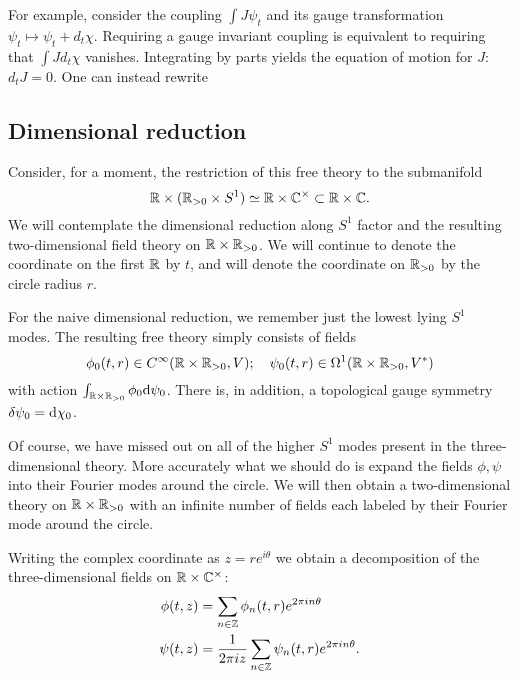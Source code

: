 \documentclass[11pt]{amsart}
\begin{document}
For example, consider the coupling $\int J \psi_t$ and its gauge transformation $\psi_t \mapsto \psi_t + d_t \chi$. Requiring a gauge invariant coupling is equivalent to requiring that $\int J d_t \chi$ vanishes. Integrating by parts yields the equation of motion for $J$: $d_t J = 0$. One can instead rewrite 








\subsection*{Dimensional reduction}

Consider, for a moment, the restriction of this free theory to the submanifold 
\[
\mathbb R \times (\mathbb R_{>0} \times S^1) \simeq \mathbb R \times \mathbb C^\times \subset \mathbb R \times \mathbb C .
\]
We will contemplate the dimensional reduction along $S^1$ factor and the resulting two-dimensional field theory on $\mathbb R \times \mathbb R_{>0}$. 
We will continue to denote the coordinate on the first $\mathbb R$ by $t$, and will denote the coordinate on $\mathbb R_{>0}$ by the circle radius $r$.  

For the naive dimensional reduction, we remember just the lowest lying $S^1$ modes. 
The resulting free theory simply consists of fields
\[
\phi_0(t,r) \in C^\infty(\mathbb R \times \mathbb R_{>0} , V) ; \quad \psi_0 (t,r) \in \Omega^1 (\mathbb R \times \mathbb R_{>0}, V^*) 
\] 
with action $\int_{\mathbb R\times \mathbb R_{>0}} \phi_0 {\rm d} \psi_0$.
There is, in addition, a topological gauge symmetry $\delta \psi_0 = {\rm d} \chi_0$. 

Of course, we have missed out on all of the higher $S^1$ modes present in the three-dimensional theory. 
More accurately what we should do is expand the fields $\phi, \psi$ into their Fourier modes around the circle.
We will then obtain a two-dimensional theory on $\mathbb R \times \mathbb R_{>0}$ with an infinite number of fields each labeled by their Fourier mode around the circle. 

Writing the complex coordinate as $z = r e^{i \theta}$ we obtain a decomposition of the three-dimensional fields on $\mathbb R \times \mathbb C^\times$:
\begin{align*}
\phi(t,z) & = \sum_{n \in \mathbb Z} \phi_n (t,r) e^{2 \pi i n \theta} \\
\psi(t,z) & = \frac{1}{2 \pi i z} \sum_{n \in \mathbb Z} \psi_n(t, r) e^{2 \pi i n \theta} .
\end{align*}
\end{document}
